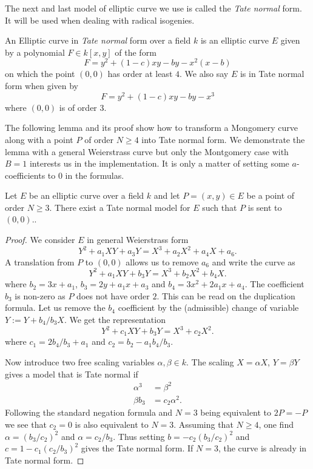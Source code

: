 \documentclass[../main/main.tex]{subfiles}
\begin{document}
The next and last model of elliptic curve we use is called the \textit{Tate normal} form.
It will be used when dealing with radical isogenies.
\begin{definition}
	An Elliptic curve in \textit{Tate normal} form over a field $k$ is an elliptic curve $E$ given by a polynomial $F\in k[x, y]$ of the form
	\[
		F = y^2 + (1-c)xy - by - x^2(x-b)
	\]
	on which the point $(0,0)$ has order at least $4$.
	We also say $E$ is in Tate normal form when given by
	\[
		F = y^2 + (1-c)xy - by - x^3
	\]
	where $(0,0)$ is of order $3$.
\end{definition}
The following lemma and its proof show how to transform a Mongomery curve along with a point $P$ of order $N\geq 4$ into Tate normal form.
We demonstrate the lemma with a general Weierstrass curve but only the Montgomery case with $B=1$ interests us in the implementation.
It is only a matter of setting some $a$-coefficients to $0$ in the formulas.
\begin{lemma}
	Let $E$ be an elliptic curve over a field $k$ and let $P=(x, y)\in E$ be a point of order $N\geq 3$.
	There exist a Tate normal model for $E$ such that $P$ is sent to $(0,0)$..
\end{lemma}
\begin{proof}
	We consider $E$ in general Weierstrass form
	\[
		Y^2 + a_1XY + a_3Y = X^3 +a_2 X^2 + a_4 X + a_6.
	\]
	A translation from $P$ to $(0, 0)$ allows us to remove $a_6$ and write the curve as
	\[
		Y^2 + a_1XY + b_3Y = X^3 +b_2 X^2 + b_4 X.
	\]
	where $b_2 = 3x+a_1$, $b_3 = 2y + a_1x + a_3$ and $b_4 = 3x^2 +2a_1x+a_4$.
	The coefficient $b_3$ is non-zero as $P$ does not have order $2$.
	This can be read on the duplication formula.
	Let us remove the $b_4$ coefficient by the (admissible) change of variable $Y :=Y + b_4 /b_3  X$.
	We get the representation
	\[
		Y^2 + c_1XY + b_3Y = X^3 +c_2 X^2.
	\]
	where  $c_1 = 2 b_4 / b_3 + a_1$ and $c_2 = b_2 - a_1b_4/b_3$.

	Now introduce two free scaling variables $\alpha, \beta\in k$.
	The scaling $X = \alpha X$, $Y = \beta Y$ gives a model that is Tate normal if
	\begin{align*}
		{\alpha}^3 &= 	{\beta}^2 \\
		\beta b_3 &= c_2 {\alpha}^2.
	\end{align*}
	Following the standard negation formula and $N=3$ being equivalent to $2P = -P$ we see that $c_2 = 0$ is also equivalent to $N=3$.
	Assuming that $N\geq 4$, one find $\alpha = ({b_3}/c_2)^2$ and $\alpha = c_2/b_3$.
	Thus setting $b = -c_2(b_3/c_2)^2$ and $c = 1-c_1(c_2/b_3)^2$ gives the Tate normal form.
	If  $N=3$, the curve is already in Tate normal form.
\end{proof}
\end{document}
